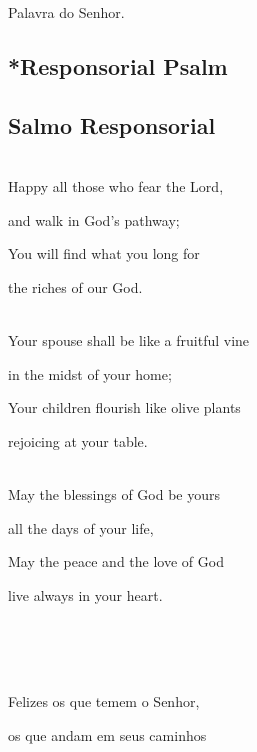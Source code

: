 \documentclass[10pt,a4]{article}
\newcommand \subsect[2] {\subsection*{#1} \switchcolumn \subsection*{#2} \switchcolumn*}
\begin{document}
\begin{paracol}{2}
Palavra do Senhor.


 \switchcolumn*

 \subsect{*Responsorial Psalm}{Salmo Responsorial}

 \\

 Happy all those who fear the Lord,

 \hspace*{2em}and walk in God's pathway;

You will find what you long for

 \hspace*{2em}the riches of our God.

 \\

 Your spouse shall be like a fruitful vine

 \hspace*{2em}in the midst of your home;

 Your children flourish like olive plants

 \hspace*{2em}rejoicing at your table.

 \\

May the blessings of God be yours

 \hspace*{2em}all the days of your life,

 May the peace and the love of God

 \hspace*{2em}live always in your heart.

 \\


\switchcolumn

\\
\\

Felizes os que temem o Senhor,  

\hspace*{2em}os que andam em seus caminhos


\end{paracol}
\end{document}
